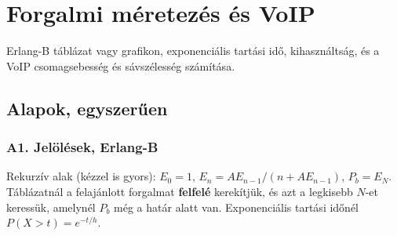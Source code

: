 \setcounter{chapter}{10}
\chapter{\texorpdfstring{Forgalmi méretezés és VoIP}{Forgalmi méretezés és VoIP}}\label{f11}
Erlang-B táblázat vagy grafikon, exponenciális tartási idő, kihasználtság, és a VoIP csomagsebesség és sávszélesség számítása.

\section{Alapok, egyszerűen}
\subsection{\texorpdfstring{A1. Jelölések, Erlang-B}{A1. Jelölések, Erlang-B}}\label{a11-erlang}
\par{}\par

\begin{center}\end{center}

Rekurzív alak (kézzel is gyors): $E_0=1$, $E_n=AE_{n-1}/(n+AE_{n-1})$, $P_b=E_N$. Táblázatnál a felajánlott forgalmat \textbf{felfelé} kerekítjük, és azt a legkisebb $N$-et keressük, amelynél $P_b$ még a határ alatt van. Exponenciális tartási időnél $P(X>t)=e^{-t/h}$.

